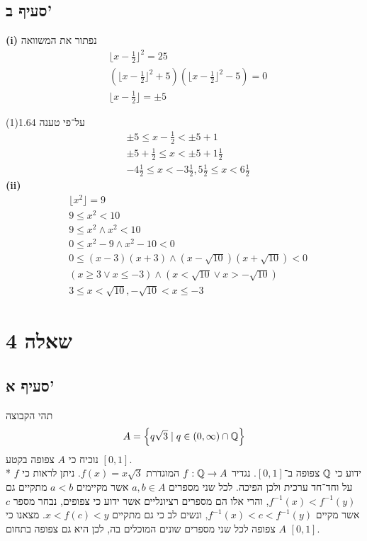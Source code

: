 \subsection{סעיף ב'}
\textbf{(i)}
נפתור את המשוואה
\begin{align*}
	& \lfloor x - \frac{1}{2} \rfloor^2 = 25 \\
	& (\lfloor x - \frac{1}{2} \rfloor^2 + 5)(\lfloor x - \frac{1}{2} \rfloor^2 - 5) = 0 \\
	& \lfloor x - \frac{1}{2} \rfloor = \pm 5
\end{align*}

על־פי טענה 1.64(1)
\begin{align*}
	& \pm 5 \le x - \frac{1}{2} < \pm 5 + 1 \\
	& \pm 5 + \frac{1}{2} \le x < \pm 5 + 1\frac{1}{2}  \\
	& -4 \frac{1}{2} \le x < -3\frac{1}{2}, 5\frac{1}{2} \le x < 6\frac{1}{2}
\end{align*}
\textbf{(ii)}
\begin{align*}
	& \lfloor x^2 \rfloor = 9 \\
	& 9 \le x^2 < 10 \\
	& 9 \le x^2 \land x^2 < 10 \\
	& 0 \le x^2 - 9 \land x^2 - 10 < 0 \\
	& 0 \le (x - 3)(x + 3) \land (x - \sqrt{10})(x + \sqrt{10}) < 0 \\
	& (x \ge 3 \lor x \le -3) \land (x < \sqrt{10} \lor x > -\sqrt{10}) \\
	& 3 \le x < \sqrt{10}, -\sqrt{10} < x \le -3
\end{align*}

\section{שאלה 4}
\subsection{סעיף א'}
תהי הקבוצה
\[
	A = \left\{ q \sqrt{3} \mid q \in (0, \infty) \cap \mathbb{Q} \right\}
\]
נוכיח כי $A$ צפופה בקטע $[0, 1]$. \\*
ידוע כי $\mathbb{Q}$ צפופה ב־$[0, 1]$.
נגדיר $f : \mathbb{Q} \to A$ המוגדרת $f(x) = x \sqrt{3}$. ניתן לראות כי $f$ על וחד־חד ערכית ולכן הפיכה.
לכל שני מספרים $a, b \in A$ אשר מקיימים $a < b$ מתקיים גם $f^{-1}(x) < f^{-1}(y)$, והרי אלו הם מספרים רציונליים אשר ידוע כי צפופים,
נבחר מספר $c$ אשר מקיים $f^{-1}(x) < c < f^{-1}(y)$, ונשים לב כי גם מתקיים $x < f(c) < y$.
מצאנו כי $A$ צפופה לכל שני מספרים שונים המוכלים בה, לכן היא גם צפופה בתחום $[0, 1]$.

